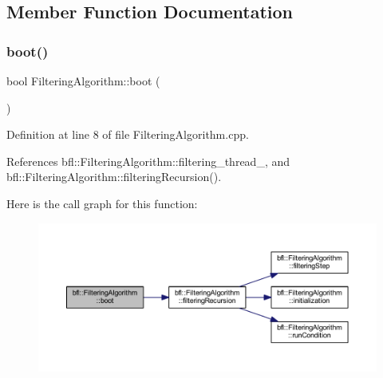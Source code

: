 \subsection{Member Function Documentation}
\mbox{\label{classbfl_1_1FilteringAlgorithm_a96651f8464190c0a56d79219a1017147}} 
\subsubsection{\texorpdfstring{boot()}{boot()}}
{\footnotesize\ttfamily bool Filtering\+Algorithm\+::boot (\begin{DoxyParamCaption}{ }\end{DoxyParamCaption})\hspace{0.3cm}{\ttfamily [inherited]}}



Definition at line 8 of file Filtering\+Algorithm.\+cpp.



References bfl\+::\+Filtering\+Algorithm\+::filtering\+\_\+thread\+\_\+, and bfl\+::\+Filtering\+Algorithm\+::filtering\+Recursion().

Here is the call graph for this function\+:
\nopagebreak
\begin{figure}[H]
\begin{center}
\leavevmode
\includegraphics[width=350pt]{classbfl_1_1FilteringAlgorithm_a96651f8464190c0a56d79219a1017147_cgraph}
\end{center}
\end{figure}
\mbox{\label{classbfl_1_1KalmanFilter_aac6bd54422cba06e34cb93cb8a659950}} 
